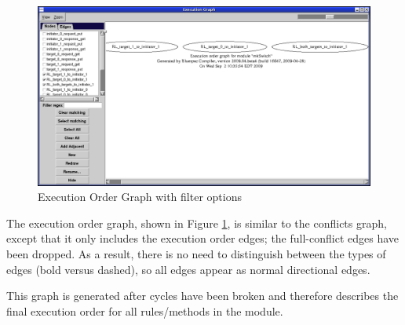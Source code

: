 \documentclass{article}
\begin{document}



\begin{figure}[htbp]
\begin{center}
\includegraphics[width = 4.5 in]{figures/executiongraph}
\caption{Execution Order Graph with filter options }
\label{fig-executiongraph}
\end{center}
\end{figure}


The execution order graph, shown in Figure \ref{fig-executiongraph},  is similar to the conflicts graph, except that it only includes
the execution
order edges; the full-conflict edges have been dropped.  As a result,
there is no need to distinguish between the types of edges (bold versus
dashed), so all edges appear as normal directional edges.

This graph is generated after cycles have been broken and therefore
describes the final execution order for all rules/methods in the
module.

\end{document}
